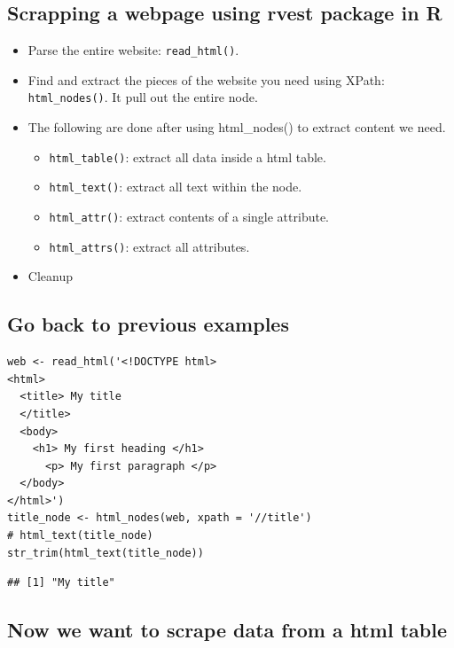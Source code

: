 \subsection{Scrapping a webpage using rvest package in
R}\label{scrapping-a-webpage-using-rvest-package-in-r}

\begin{itemize}
\tightlist
\item
  Parse the entire website: \texttt{read\_html()}.
\item
  Find and extract the pieces of the website you need using XPath:
  \texttt{html\_nodes()}. It pull out the entire node.
\item
  The following are done after using html\_nodes() to extract content we
  need.

  \begin{itemize}
  \tightlist
  \item
    \texttt{html\_table()}: extract all data inside a html table.
  \item
    \texttt{html\_text()}: extract all text within the node.
  \item
    \texttt{html\_attr()}: extract contents of a single attribute.
  \item
    \texttt{html\_attrs()}: extract all attributes.
  \end{itemize}
\item
  Cleanup
\end{itemize}

\subsection{Go back to previous
examples}\label{go-back-to-previous-examples}

\begin{verbatim}
web <- read_html('<!DOCTYPE html>
<html>
  <title> My title
  </title>
  <body>
    <h1> My first heading </h1>
      <p> My first paragraph </p>
  </body>
</html>')
title_node <- html_nodes(web, xpath = '//title')
# html_text(title_node)
str_trim(html_text(title_node))
\end{verbatim}

\begin{verbatim}
## [1] "My title"
\end{verbatim}

\subsection{Now we want to scrape data from a html
table}\label{now-we-want-to-scrape-data-from-a-html-table}

